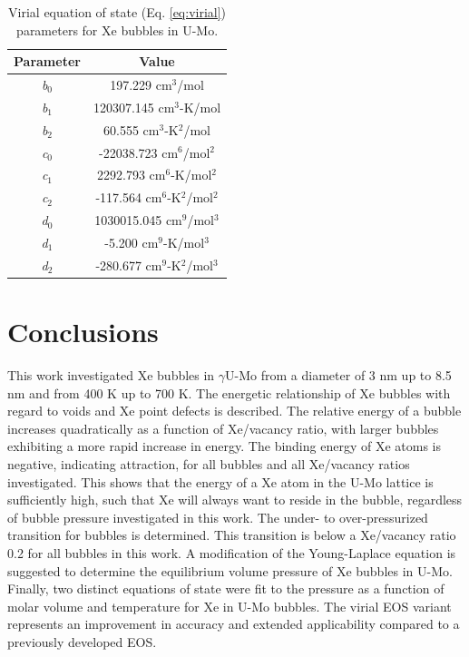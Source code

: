 \documentclass[review]{elsarticle}
\begin{document}
\begin{table}[h!]
\caption{Virial equation of state (Eq. \ref{eq:virial}) parameters for Xe bubbles in U-Mo.}
\label{tab:virial}
\begin{center}
\begin{tabular}{|c|c|}
     \hline
      Parameter & Value \\
     \hline
     \textit{b$_0$} & 197.229 cm$^3$/mol \\
     \textit{b$_1$} & 120307.145 cm$^3$-K/mol  \\
     \textit{b$_2$} & 60.555 cm$^3$-K$^2$/mol \\
     \textit{c$_0$} & -22038.723 cm$^6$/mol$^2$ \\
     \textit{c$_1$} & 2292.793 cm$^6$-K/mol$^2$  \\
     \textit{c$_2$} & -117.564 cm$^6$-K$^2$/mol$^2$ \\
     \textit{d$_0$} & 1030015.045 cm$^9$/mol$^3$ \\
     \textit{d$_1$} & -5.200 cm$^9$-K/mol$^3$ \\
     \textit{d$_2$} & -280.677 cm$^9$-K$^2$/mol$^3$ \\
     \hline
\end{tabular}
\end{center}
\label{default}
\end{table}%

\FloatBarrier

\section{Conclusions}

This work investigated Xe bubbles in $\gamma$U-Mo from a diameter of 3 nm up to 8.5 nm and from 400 K up to 700 K. The energetic relationship of Xe bubbles with regard to voids and Xe point defects is described. The relative energy of a bubble increases quadratically as a function of Xe/vacancy ratio, with larger bubbles exhibiting a more rapid increase in energy. The binding energy of Xe atoms is negative, indicating attraction, for all bubbles and all Xe/vacancy ratios investigated. This shows that the energy of a Xe atom in the U-Mo lattice is sufficiently high, such that Xe will always want to reside in the bubble, regardless of bubble pressure investigated in this work. The under- to over-pressurized transition for bubbles is determined. This transition is below a Xe/vacancy ratio 0.2 for all bubbles in this work. A modification of the Young-Laplace equation is suggested to determine the equilibrium volume pressure of Xe bubbles in U-Mo. Finally, two distinct equations of state were fit to the pressure as a function of molar volume and temperature for Xe in U-Mo bubbles. The virial EOS variant represents an improvement in accuracy and extended applicability compared to a previously developed EOS.
\end{document}

